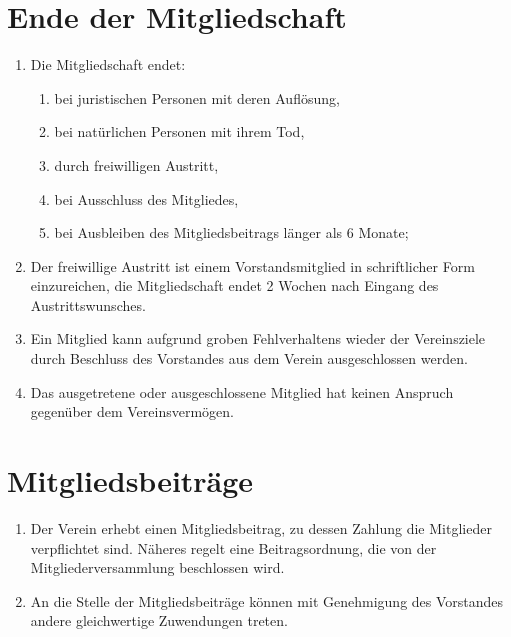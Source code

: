 \documentclass[ngerman]{article}
\begin{document}
\section{Ende der Mitgliedschaft}
\begin{enumerate}
  \item Die Mitgliedschaft endet:
  \begin{enumerate}
    \item bei juristischen Personen mit deren Auflösung,
    \item bei natürlichen Personen mit ihrem Tod,
    \item durch freiwilligen Austritt,
    \item bei Ausschluss des Mitgliedes,
    \item bei Ausbleiben des Mitgliedsbeitrags länger als 6 Monate;
  \end{enumerate}
  \item Der freiwillige Austritt ist einem Vorstandsmitglied in schriftlicher Form einzureichen, die Mitgliedschaft endet 2 Wochen nach Eingang des Austrittswunsches.
  \item Ein Mitglied kann aufgrund groben Fehlverhaltens wieder der Vereinsziele durch Beschluss des Vorstandes aus dem Verein ausgeschlossen werden.
  \item Das ausgetretene oder ausgeschlossene Mitglied hat keinen Anspruch gegenüber dem Vereinsvermögen.
\end{enumerate}

\section{Mitgliedsbeiträge}
\begin{enumerate}
  \item Der Verein erhebt einen Mitgliedsbeitrag, zu dessen Zahlung die Mitglieder verpflichtet sind.
Näheres regelt eine Beitragsordnung, die von der Mitgliederversammlung beschlossen wird.
  \item An die Stelle der Mitgliedsbeiträge können mit Genehmigung des Vorstandes andere gleichwertige Zuwendungen treten.
\end{enumerate}
\end{document}
